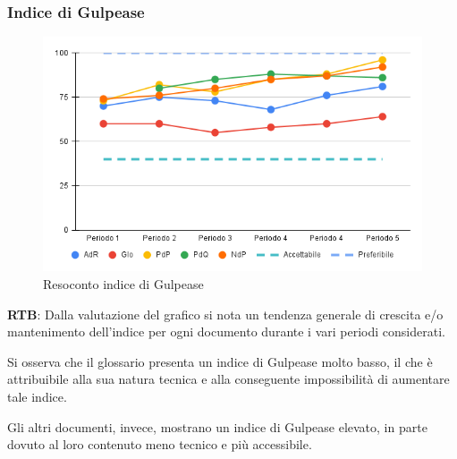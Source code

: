 \subsubsection{Indice di Gulpease}

\vspace{0.3cm}

\begin{figure}[H]
    \centering
    \includegraphics[width=1\textwidth]{../Images/PianoDiQualifica/Gulpease.png}
    \caption{Resoconto indice di Gulpease}
    \label{fig:Indice di Gulpease}
\end{figure}

\vspace{0.2cm}

\textbf{RTB}: Dalla valutazione del grafico si nota un tendenza generale di crescita e/o mantenimento dell'indice per ogni documento durante i vari periodi considerati.

\vspace{0.2cm}

Si osserva che il glossario presenta un indice di Gulpease molto basso, il che è attribuibile alla sua natura tecnica e alla conseguente impossibilità di aumentare tale indice.

\vspace{0.2cm}

Gli altri documenti, invece, mostrano un indice di Gulpease elevato, in parte dovuto al loro contenuto meno tecnico e più accessibile.